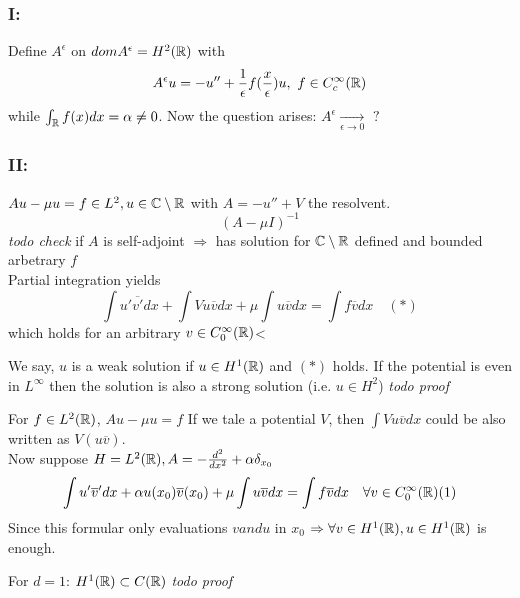 \subsubsection{I:} Define $A^{\epsilon}$ on $dom A^{\epsilon} = H^{2}(\mathbb{R})$ with
	\[ A^{\epsilon} u = - u'' + \frac{1}{\epsilon} f(\frac{x}{\epsilon}) u, ~ f \in C_{c}^{\infty}(\mathbb{R}) \]
while $\int_{\mathbb{R}} f(x) dx = \alpha \neq 0$.	Now the question arises: $A^{\epsilon} \xrightarrow[\epsilon \to 0]{}$ $?$

\subsubsection{II:} $A u - \mu u = f \in L^{2}, u \in \mathbb{C} \setminus \mathbb{R}$ with $A = - u'' + V$ the resolvent.
	\[ \left( A - \mu I \right)^{-1} \] \textit{todo check} %
	if $A$ is self-adjoint $\Rightarrow$ has solution for $\mathbb{C} \setminus \mathbb{R}$ defined and bounded arbetrary $f$ \\
Partial integration yields
	\[ \int u' \overline{v'} dx + \int V u \overline{v} dx + \mu \int u \overline{v} dx = \int f \overline{v} dx \quad (*) \]
which holds for an arbitrary $v \in C_{0}^{\infty}(\mathbb{R})$<	
	
We say, $u$ is a weak solution if $u \in H^{1}(\mathbb{R})$ and $(*)$ holds. If the potential is even in $L^{\infty}$ then the solution is also a strong solution (i.e. $u \in H^{2}$) \textit{todo proof} %

For $f \in L^{2}(\mathbb{R})$, $Au - \mu u = f$	
If we tale a potential $V$, then $\int V u \overline{v} dx$ could be also written as $V(u \overline{v})$. \\
Now suppose $H = L^{2}(\mathbb{R}), A = - \frac{d^{2}}{dx^{2}} + \alpha \delta_{x_{0}}$
	\[ \int u' \overline{v}' dx + \alpha u(x_{0}) \overline{v}(x_{0}) + \mu \int u \overline{v} dx = \int f \overline{v} dx \quad \forall v \in C_{0}^{\infty}(\mathbb{R}) (1) \]
Since this formular only evaluations $v and u$ in $x_{0}$ $\Rightarrow \forall v \in H^{1}(\mathbb{R}), u \in H^{1}(\mathbb{R})$ is enough.
\newline

For $d = 1$: $H^{1}(\mathbb{R}) \subset C(\mathbb{R})$ \textit{todo proof} %

 \newpage  %
